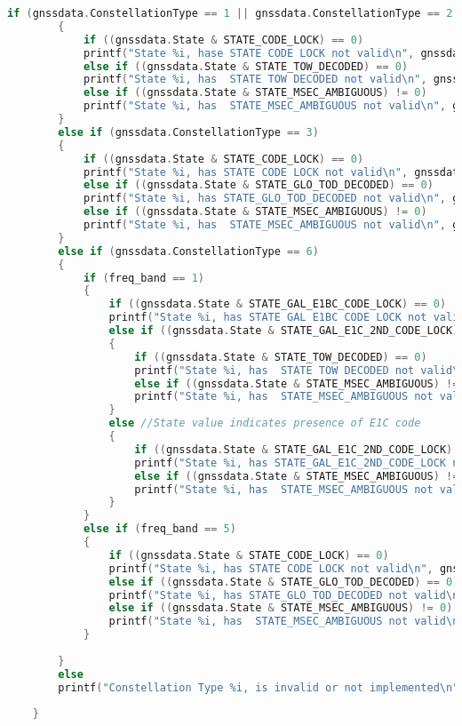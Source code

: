 \begin{lstlisting}[language=c]
		if (gnssdata.ConstellationType == 1 || gnssdata.ConstellationType == 2 || gnssdata.ConstellationType == 4 || gnssdata.ConstellationType == 5)
		{
			if ((gnssdata.State & STATE_CODE_LOCK) == 0)
			printf("State %i, hase STATE CODE LOCK not valid\n", gnssdata.State);
			else if ((gnssdata.State & STATE_TOW_DECODED) == 0)
			printf("State %i, has  STATE TOW DECODED not valid\n", gnssdata.State);
			else if ((gnssdata.State & STATE_MSEC_AMBIGUOUS) != 0)
			printf("State %i, has  STATE_MSEC_AMBIGUOUS not valid\n", gnssdata.State);
		}
		else if (gnssdata.ConstellationType == 3)
		{
			if ((gnssdata.State & STATE_CODE_LOCK) == 0)
			printf("State %i, has STATE CODE LOCK not valid\n", gnssdata.State);
			else if ((gnssdata.State & STATE_GLO_TOD_DECODED) == 0)
			printf("State %i, has STATE_GLO_TOD_DECODED not valid\n", gnssdata.State);
			else if ((gnssdata.State & STATE_MSEC_AMBIGUOUS) != 0)
			printf("State %i, has  STATE_MSEC_AMBIGUOUS not valid\n", gnssdata.State);
		}
		else if (gnssdata.ConstellationType == 6)
		{
			if (freq_band == 1)
			{
				if ((gnssdata.State & STATE_GAL_E1BC_CODE_LOCK) == 0)
				printf("State %i, has STATE GAL E1BC CODE LOCK not valid\n", gnssdata.State);
				else if ((gnssdata.State & STATE_GAL_E1C_2ND_CODE_LOCK) == 0) //State value indicates presence of E1B code
				{
					if ((gnssdata.State & STATE_TOW_DECODED) == 0)
					printf("State %i, has  STATE TOW DECODED not valid\n", gnssdata.State);
					else if ((gnssdata.State & STATE_MSEC_AMBIGUOUS) != 0)
					printf("State %i, has  STATE_MSEC_AMBIGUOUS not valid\n", gnssdata.State);
				}
				else //State value indicates presence of E1C code
				{
					if ((gnssdata.State & STATE_GAL_E1C_2ND_CODE_LOCK) == 0)
					printf("State %i, has STATE_GAL_E1C_2ND_CODE_LOCK not valid\n", gnssdata.State);
					else if ((gnssdata.State & STATE_MSEC_AMBIGUOUS) != 0)
					printf("State %i, has  STATE_MSEC_AMBIGUOUS not valid\n", gnssdata.State);
				}
			}
			else if (freq_band == 5)
			{
				if ((gnssdata.State & STATE_CODE_LOCK) == 0)
				printf("State %i, has STATE CODE LOCK not valid\n", gnssdata.State);
				else if ((gnssdata.State & STATE_GLO_TOD_DECODED) == 0)
				printf("State %i, has STATE_GLO_TOD_DECODED not valid\n", gnssdata.State);
				else if ((gnssdata.State & STATE_MSEC_AMBIGUOUS) != 0)
				printf("State %i, has  STATE_MSEC_AMBIGUOUS not valid\n", gnssdata.State);
			}
			
		}
		else
		printf("Constellation Type %i, is invalid or not implemented\n", gnssdata.ConstellationType);
		
	}
	

\end{lstlisting}
